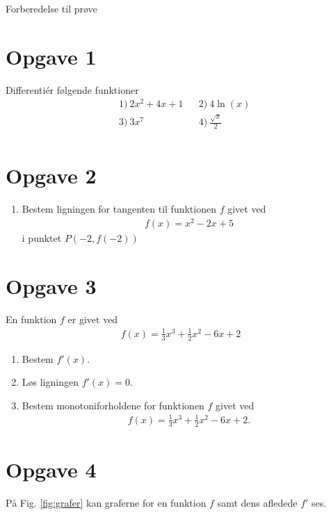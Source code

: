 \begin{center}
\Huge
Forberedelse til prøve
\end{center}

\section*{Opgave 1}
Differentiér følgende funktioner
\begin{align*}
	&1) \ 2x^2+4x+1    &&2) \ 4\ln(x)    \\
	&3) \  3x^7   &&4) \ \frac{\sqrt{x}}{2}    \\
\end{align*}

\section*{Opgave 2}

\begin{enumerate}[label=\roman*)]
	\item Bestem ligningen for tangenten til funktionen $f$ givet ved
	\begin{align*}
		f(x) = x^2-2x+5
	\end{align*}
	i punktet $P(-2,f(-2))$
\end{enumerate}

\section*{Opgave 3}
En funktion $f$ er givet ved
\begin{align*}
	f(x) = \frac{1}{3}x^3+\frac{1}{2}x^2-6x+2
\end{align*}
\begin{enumerate}[label=\roman*)]
	\item Bestem $f'(x)$.
	\item Løs ligningen $f'(x) = 0$.
	\item Bestem monotoniforholdene for funktionen $f$ givet ved
	\begin{align*}
		f(x) = \frac{1}{3}x^3 + \frac{1}{2}x^2 -6x +2.
	\end{align*}
\end{enumerate}

\section*{Opgave 4}
På Fig. \ref{fig:grafer} kan graferne for en funktion $f$ samt dens afledede $f'$ ses.

